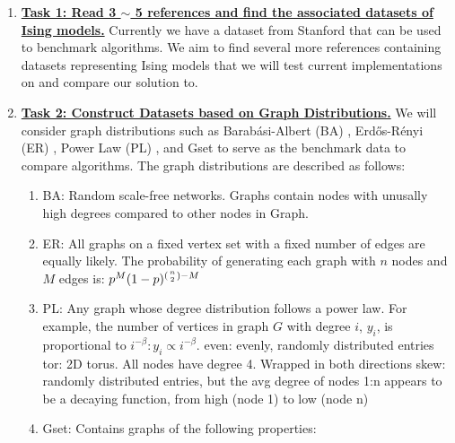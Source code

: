 \documentclass{article}
\begin{document}
\begin{enumerate}
\begin{enumerate}
\begin{enumerate}
		\item \textbf{\underline{Task 1: Read 3 $\sim$ 5 references and find the associated datasets of Ising models.}}
		\newline Currently we have a dataset from Stanford that can be used to benchmark algorithms. We aim to find several more references containing datasets representing Ising models that we will test current implementations on and compare our solution to.
		\item \textbf{\underline{Task 2: Construct Datasets based on Graph Distributions.}} We will consider graph distributions such as Barab\'asi-Albert (BA) \cite{b11}, Erd\H os-R\'enyi (ER) \cite{b8}, Power Law (PL) \cite{b9}, and Gset to serve as the benchmark data to compare algorithms. The graph distributions are described as follows:
		\begin{enumerate}
			\item BA: Random scale-free networks. Graphs contain nodes with unusally high degrees compared to other nodes in Graph.
			\item ER: All graphs on a fixed vertex set with a fixed number of edges are equally likely. The probability of generating each graph with $n$ nodes and $M$ edges is: $p^M(1-p)^{({n \atop 2})-M}$
			\item PL: Any graph whose degree distribution follows a power law. For example, the number of vertices in graph $G$ with degree $i$, $y_i$, is proportional to $i^{-\beta}:y_i \propto i^{-\beta}$.
even:	evenly, randomly distributed entries
 	tor:	2D torus.   All nodes have degree 4.  Wrapped in both directions
 	skew:	randomly distributed entries, but the avg degree of nodes 1:n
 		appears to be a decaying function, from high (node 1) to low
 		(node n)
			\item Gset: Contains graphs of the following properties:


\end{enumerate}
\end{enumerate}
\end{enumerate}
\end{enumerate}
\end{document}
